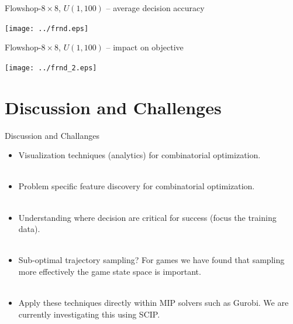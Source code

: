 \documentclass[compress]{beamer}
\begin{document}
\begin{frame}{Flowshop-$8\times 8$, $U(1,100)$ -- average decision accuracy}
\begin{center}
\texttt{[image: ../frnd.eps]}
\end{center}
\end{frame}





\begin{frame}{Flowshop-$8\times 8$, $U(1,100)$ -- impact on objective}
\begin{center}
\texttt{[image: ../frnd\_2.eps]}
\end{center}

\end{frame}

\section{Discussion and Challenges}

\begin{frame}{Discussion and Challanges}

\begin{itemize}
\item Visualization techniques (analytics) for combinatorial optimization.\\ \ \pause
\item Problem specific feature discovery for combinatorial optimization.\\ \ \pause
\item Understanding where decision are critical for success (focus the training data).\\ \ \pause
\item Sub-optimal trajectory sampling? For games we have found that sampling more effectively the game state space is important.\\ \ \pause
\item Apply these techniques directly within MIP solvers such as Gurobi. We are currently investigating this using SCIP. \ \pause
\end{itemize}

\end{frame}
\end{document}
